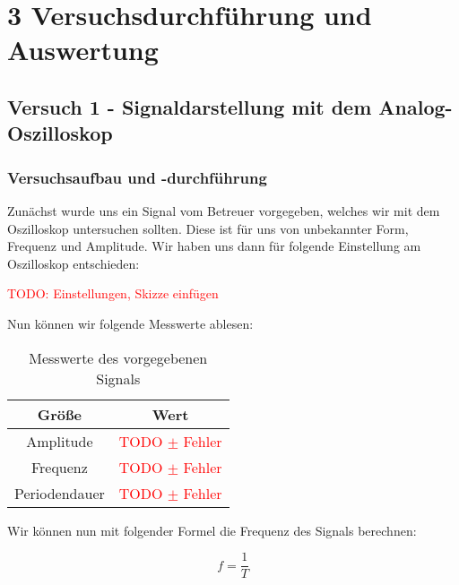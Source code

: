 \chapter*{3 Versuchsdurchführung und Auswertung}
\setcounter{chapter}{3}
\setcounter{section}{0}
\setcounter{subsection}{0}

\section{Versuch 1 - Signaldarstellung mit dem Analog-Oszilloskop}

    \subsection{Versuchsaufbau und -durchführung}
    Zunächst wurde uns ein Signal vom Betreuer vorgegeben, welches wir mit dem Oszilloskop untersuchen sollten. Diese ist für uns von unbekannter Form, Frequenz und Amplitude. Wir haben uns dann für folgende Einstellung am Oszilloskop entschieden:

    \textcolor{red}{TODO: Einstellungen, Skizze einfügen}

    Nun können wir folgende Messwerte ablesen:
    \begin{table}[H]
        \centering
        \caption{Messwerte des vorgegebenen Signals}
        \vspace{0.5em}
        \begin{tabular}{|c|c|}
            \hline
            \textbf{Größe} & \textbf{Wert} \\
            \hline
            Amplitude & \textcolor{red}{TODO $\pm$ Fehler} \\
            \hline
            Frequenz & \textcolor{red}{TODO $\pm$ Fehler} \\
            \hline
            Periodendauer & \textcolor{red}{TODO $\pm$ Fehler} \\
            \hline
        \end{tabular}
        
        \label{tab:Versuch1_Messwerte}
    \end{table}
    
    Wir können nun mit folgender Formel die Frequenz des Signals berechnen:

    \begin{equation}
        f = \frac{1}{T}
        \label{eq:Versuch1_Frequenz}
    \end{equation}

